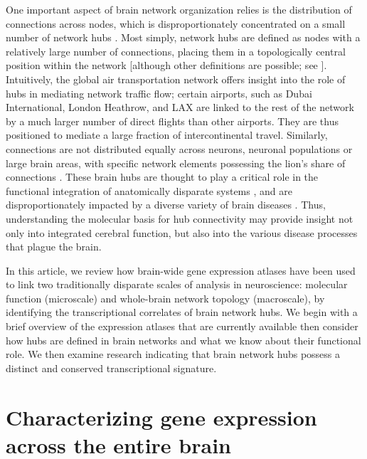 One important aspect of brain network organization relies is the distribution of connections across nodes, which is disproportionately concentrated on a small number of network hubs \citep{VandenHeuvel2011,Towlson2013}. Most simply, network hubs are defined as nodes with a relatively large number of connections, placing them in a topologically central position within the network [although other definitions are possible; see \citep{Power2011,Oldham}].
Intuitively, the global air transportation network offers insight into the role of hubs in mediating network traffic flow; certain airports, such as Dubai International, London Heathrow, and LAX are linked to the rest of the network by a much larger number of direct flights than other airports. They are thus positioned to mediate a large fraction of intercontinental travel. Similarly, connections are not distributed equally across neurons, neuronal populations or large brain areas, with specific network elements possessing the lion’s share of connections \citep{VandenHeuvel2011,Towlson2013,DeReus2014,VandenHeuvel2016}.
These brain hubs are thought to play a critical role in the functional integration of anatomically disparate systems \citep{Harriger2012,VandenHeuvel2012}, and are disproportionately impacted by a diverse variety of brain diseases \citep{Crossley2014,Fornito2015}. Thus, understanding the molecular basis for hub connectivity may provide insight not only into integrated cerebral function, but also into the various disease processes that plague the brain.

In this article, we review how brain-wide gene expression atlases have been used to link two traditionally disparate scales of analysis in neuroscience: molecular function (microscale) and whole-brain network topology (macroscale), by identifying the transcriptional correlates of brain network hubs. We begin with a brief overview of the expression atlases that are currently available then consider how hubs are defined in brain networks and what we know about their functional role. We then examine research indicating that brain network hubs possess a distinct and conserved transcriptional signature.

\section{Characterizing gene expression across the entire brain}

